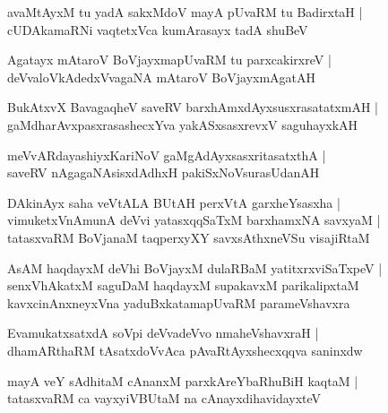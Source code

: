\begin{shloka}
avaMtAyxM tu yadA sakxMdoV mayA pUvaRM tu BadirxtaH |\\
cUDAkamaRNi vaqtetxVca kumArasayx tadA shuBeV
\end{shloka}

\begin{shloka}
Agatayx mAtaroV BoVjayxmapUvaRM tu parxcakirxreV |\\
deVvaloVkAdedxVvagaNA mAtaroV BoVjayxmAgatAH
\end{shloka}

\begin{shloka}
BukAtxvX BavagaqheV saveRV barxhAmxdAyxsusxrasatatxmAH |\\
gaMdharAvxpasxrasashecxYva yakASxsasxrevxV saguhayxkAH  
\end{shloka}

\begin{shloka}
meVvARdayashiyxKariNoV gaMgAdAyxsasxritasatxthA |\\
saveRV nAgagaNAsisxdAdhxH pakiSxNoVsurasUdanAH 
\end{shloka}

\begin{shloka}
DAkinAyx saha veVtALA BUtAH perxVtA garxheYsasxha |\\
vimuketxVnAmunA deVvi yatasxqqSaTxM barxhamxNA savxyaM |\\
tatasxvaRM BoVjanaM taqperxyXY savxsAthxneVSu visajiRtaM
\end{shloka}

\begin{shloka}
AsAM haqdayxM deVhi BoVjayxM dulaRBaM yatitxrxviSaTxpeV |\\
senxVhAkatxM saguDaM haqdayxM supakavxM parikalipxtaM\\
kavxcinAnxneyxVna yaduBxkatamapUvaRM parameVshavxra
\end{shloka}

\begin{shloka}
EvamukatxsatxdA soVpi deVvadeVvo nmaheVshavxraH |\\
dhamARthaRM tAsatxdoVvAca pAvaRtAyxshecxqqva saninxdw
\end{shloka}

\begin{shloka}
mayA veY sAdhitaM cAnanxM parxkAreYbaRhuBiH kaqtaM |\\
tatasxvaRM ca vayxyiVBUtaM na cAnayxdihavidayxteV 
\end{shloka}


